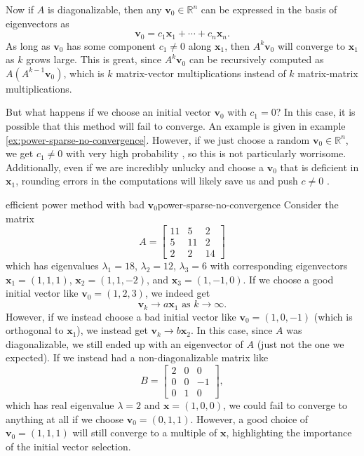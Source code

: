 \documentclass{article}
\let\vec\mathbf
\begin{document}
Now if $A$ is diagonalizable, then any $\vec{v}_0 \in \mathbb{R}^n$ can be expressed in the basis of eigenvectors as
\begin{equation*}
  \vec{v}_0 = c_1\vec{x}_1 + \cdots + c_n\vec{x}_n.
\end{equation*}
As long as $\vec{v}_0$ has some component $c_1 \neq 0$ along $\vec{x}_1$, then $A^k\vec{v}_0$ will converge to $\vec{x}_1$ as $k$ grows large. This is great, since $A^k\vec{v}_0$ can be recursively computed as $A(A^{k-1}\vec{v}_0)$, which is $k$ matrix-vector multiplications instead of $k$ matrix-matrix multiplications.

But what happens if we choose an initial vector $\vec{v}_0$ with $c_1 = 0$? In this case, it is possible that this method will fail to converge. An example is given in example \ref{ex:power-sparse-no-convergence}. However, if we just choose a random $\vec{v}_0 \in \mathbb{R}^n$, we get $c_1 \neq 0$ with very high probability \cite[p.~53]{cornell}, so this is not particularly worrisome. Additionally, even if we are incredibly unlucky and choose a $\vec{v}_0$ that is deficient in $\vec{x}_1$, rounding errors in the computations will likely save us and push $c \neq 0$ \cite{pwr-rot}.

\begin{example}{efficient power method with bad $\vec{v}_0$}{power-sparse-no-convergence}
  Consider the matrix
  \begin{equation*}
    A = \begin{bmatrix}11 & 5 & 2 \\ 5 & 11 & 2 \\ 2 & 2 & 14\end{bmatrix}
  \end{equation*}
  which has eigenvalues $\lambda_1 = 18$, $\lambda_2 = 12$, $\lambda_3 = 6$ with corresponding eigenvectors $\vec{x}_1 = (1,1,1)$, $\vec{x}_2 = (1,1,-2)$, and $\vec{x}_3 = (1,-1,0)$. If we choose a good initial vector like $\vec{v}_0 = (1,2,3)$, we indeed get
  \begin{equation*}
    \vec{v}_k \to a\vec{x}_1 \textrm{  as  } k \to \infty.
  \end{equation*}
  However, if we instead choose a bad initial vector like $\vec{v}_0 = (1,0,-1)$ (which is orthogonal to $\vec{x}_1$), we instead get $\vec{v}_k \to b\vec{x}_2$. In this case, since $A$ was diagonalizable, we still ended up with an eigenvector of $A$ (just not the one we expected). If we instead had a non-diagonalizable matrix like
  \begin{equation*}
    B = \begin{bmatrix}2 & 0 & 0 \\ 0 & 0 & -1 \\ 0 & 1 & 0\end{bmatrix},
  \end{equation*}
  which has real eigenvalue $\lambda=2$ and $\vec{x} = (1,0,0)$, we could fail to converge to anything at all if we choose $\vec{v}_0 = (0,1,1)$. However, a good choice of $\vec{v}_0 = (1,1,1)$ will still converge to a multiple of $\vec{x}$, highlighting the importance of the initial vector selection.
\end{example}
\end{document}
